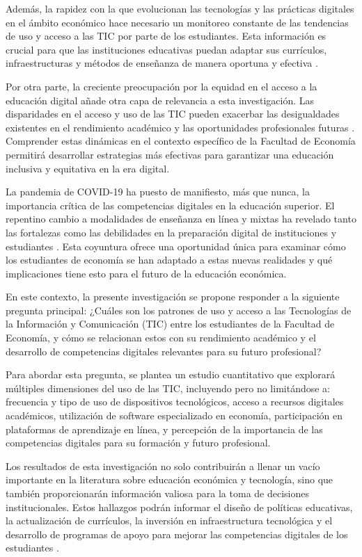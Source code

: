 \documentclass[12pt, a4paper]{article}
\begin{document}
Además, la rapidez con la que evolucionan las tecnologías y las prácticas digitales en el ámbito económico hace necesario un monitoreo constante de las tendencias de uso y acceso a las TIC por parte de los estudiantes. Esta información es crucial para que las instituciones educativas puedan adaptar sus currículos, infraestructuras y métodos de enseñanza de manera oportuna y efectiva \parencite{Kirkwood2014}.

Por otra parte, la creciente preocupación por la equidad en el acceso a la educación digital añade otra capa de relevancia a esta investigación. Las disparidades en el acceso y uso de las TIC pueden exacerbar las desigualdades existentes en el rendimiento académico y las oportunidades profesionales futuras \parencite{Warschauer2010}. Comprender estas dinámicas en el contexto específico de la Facultad de Economía permitirá desarrollar estrategias más efectivas para garantizar una educación inclusiva y equitativa en la era digital.

La pandemia de COVID-19 ha puesto de manifiesto, más que nunca, la importancia crítica de las competencias digitales en la educación superior. El repentino cambio a modalidades de enseñanza en línea y mixtas ha revelado tanto las fortalezas como las debilidades en la preparación digital de instituciones y estudiantes \parencite{Hodges2020}. Esta coyuntura ofrece una oportunidad única para examinar cómo los estudiantes de economía se han adaptado a estas nuevas realidades y qué implicaciones tiene esto para el futuro de la educación económica.

En este contexto, la presente investigación se propone responder a la siguiente pregunta principal: ¿Cuáles son los patrones de uso y acceso a las Tecnologías de la Información y Comunicación (TIC) entre los estudiantes de la Facultad de Economía, y cómo se relacionan estos con su rendimiento académico y el desarrollo de competencias digitales relevantes para su futuro profesional?

Para abordar esta pregunta, se plantea un estudio cuantitativo que explorará múltiples dimensiones del uso de las TIC, incluyendo pero no limitándose a: frecuencia y tipo de uso de dispositivos tecnológicos, acceso a recursos digitales académicos, utilización de software especializado en economía, participación en plataformas de aprendizaje en línea, y percepción de la importancia de las competencias digitales para su formación y futuro profesional.

Los resultados de esta investigación no solo contribuirán a llenar un vacío importante en la literatura sobre educación económica y tecnología, sino que también proporcionarán información valiosa para la toma de decisiones institucionales. Estos hallazgos podrán informar el diseño de políticas educativas, la actualización de currículos, la inversión en infraestructura tecnológica y el desarrollo de programas de apoyo para mejorar las competencias digitales de los estudiantes \parencite{Ala-Mutka2011}.
\end{document}
